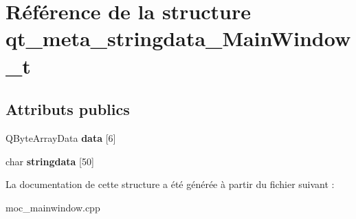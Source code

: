 \hypertarget{structqt__meta__stringdata__MainWindow__t}{\section{Référence de la structure qt\+\_\+meta\+\_\+stringdata\+\_\+\+Main\+Window\+\_\+t}
\label{structqt__meta__stringdata__MainWindow__t}
}
\subsection*{Attributs publics}
\begin{DoxyCompactItemize}
\item 
\hypertarget{structqt__meta__stringdata__MainWindow__t_a8f79e56d12892a8825330286a07da625}{Q\+Byte\+Array\+Data {\bfseries data} \mbox{[}6\mbox{]}}\label{structqt__meta__stringdata__MainWindow__t_a8f79e56d12892a8825330286a07da625}

\item 
\hypertarget{structqt__meta__stringdata__MainWindow__t_af9aa735a3253eab29f856dc258692c86}{char {\bfseries stringdata} \mbox{[}50\mbox{]}}\label{structqt__meta__stringdata__MainWindow__t_af9aa735a3253eab29f856dc258692c86}

\end{DoxyCompactItemize}


La documentation de cette structure a été générée à partir du fichier suivant \+:\begin{DoxyCompactItemize}
\item 
moc\+\_\+mainwindow.\+cpp\end{DoxyCompactItemize}
